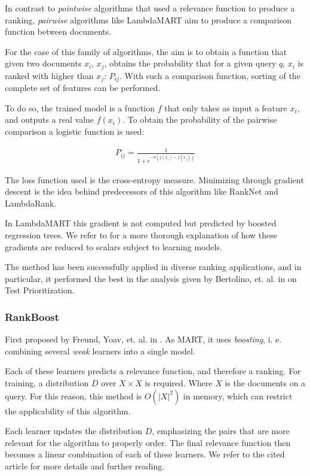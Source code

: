 In contrast to \emph{pointwise} algorithms that used a relevance function to produce a ranking, 
\emph{pairwise} algorithms like LambdaMART aim to produce a comparison function between documents.

For the case of this family of algorithms, the aim is to obtain a function that given two documents $x_i$, $x_j$, 
obtains the probability that for a given query $q$, $x_i$ is ranked with higher than $x_j$: $P_{ij}$. With 
such a comparison function, sorting of the complete set of features can be performed.

To do so, the trained model is a function $f$ that only takes as input a feature $x_i$, 
and outputs a real value $f(x_i)$. To obtain the probability of the pairwise comparison a logistic function is used:

\begin{align*}
P_{ij} = \frac{1}{1+e^{-\sigma(f(x_i)-f(x_j))}}
\end{align*}

The loss function used is the cross-entropy measure. Minimizing through gradient descent is the idea behind predecessors
of this algorithm like RankNet and LambdaRank.

In LambdaMART this gradient is not computed but predicted by boosted regression trees. We refer
to \cite{lambdamart} for a more thorough explanation of how these gradients are reduced to scalars
subject to learning models.

The method has been successfully applied in diverse ranking applications, and in particular, it performed
the best in the analysis given by Bertolino, et. al. in \cite{Bertolino2020LearningtoRankVR} on Test Prioritization.

\subsubsection{RankBoost}\label{s:bg-tsp-rankboost}

First proposed by Freund, Yoav, et. al. in \cite{10.5555/945365.964285}. As MART, it uses \emph{boosting}, i. e. combining
several \emph{weak} learners into a single model.

Each of these learners predicts a relevance function, and therefore a ranking. For training, a distribution $D$ over
$X\times X$ is required. Where $X$ is the documents on a query. For this reason, this method is $O(|X|^2)$ in memory, which
can restrict the applicability of this algorithm. 

Each learner updates the distribution $D$, emphasizing the pairs that are more relevant for the algorithm
to properly order. The final relevance function then becomes a linear combination of each of these learners.
We refer to the cited article for more details and further reading.

